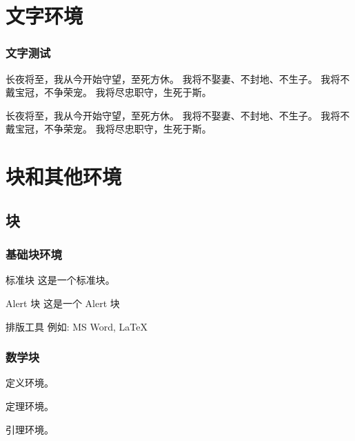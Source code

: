 \frame[plain]{\titlepage}

\section{文字环境}

\begin{frame}
    \frametitle{文字测试}
    
    长夜将至，我从今开始守望，至死方休。
    我将不娶妻、不封地、不生子。
    我将不戴宝冠，不争荣宠。
    我将尽忠职守，生死于斯。

    \vspace{0.4cm}

    \pause

    长夜将至，我从今开始守望，至死方休。
    我将不娶妻、不封地、不生子。
    我将不戴宝冠，不争荣宠。
    我将尽忠职守，生死于斯。
    
\end{frame}

\section{块和其他环境}
\subsection{块}

\begin{frame}
    \frametitle{基础块环境}

    \begin{block}{标准块}
        这是一个标准块。
    \end{block}
    \begin{alertblock}{Alert 块}
        这是一个 Alert 块
    \end{alertblock}
    \begin{exampleblock}{排版工具}
        例如: MS Word, \LaTeX{}
    \end{exampleblock}

\end{frame}

\begin{frame}
    \frametitle{数学块}

    \begin{definition} 
        定义环境。
    \end{definition}
    
    \begin{theorem} 
        定理环境。
    \end{theorem}
    
    \begin{lemma} 
        引理环境。
    \end{lemma}

\end{frame}

